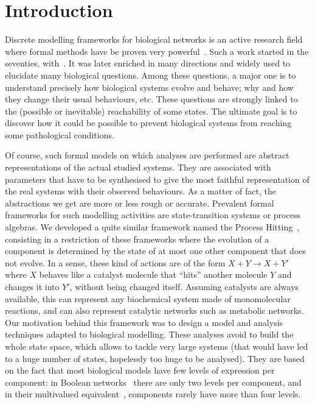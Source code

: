 \section{Introduction}
\label{sec:intro}

Discrete modelling frameworks for biological networks is an active research field where formal
methods have be proven very
powerful~\cite{thomas1990biological,deJong02,snoussi_logical_1993}.
Such a work started in the seventies, with~\cite{kauffman69,Thomas73}.
It was later enriched in many directions and widely used to elucidate many biological questions.
Among these questions, a major one is to understand precisely how biological systems evolve and behave; why and how they change their usual behaviours, etc.
These questions are strongly linked to the (possible or inevitable) reachability of some states.
The ultimate goal is to discover how it could be possible to prevent biological systems from reaching some pathological conditions.

Of course, such formal models on which analyses are performed are abstract representations of the actual studied systems.
They are associated with parameters that have to be synthesised %
to give the most faithful representation of the real systems with their observed behaviours.
As a matter of fact, the abstractions we get are more or less rough or accurate.
Prevalent formal frameworks for such modelling activities are state-transition systems or process algebras. %
We developed a quite similar framework named the Process Hitting~\cite{PMR10-TCSB},
consisting in a restriction of these frameworks where the evolution of a component is determined by the state of at most one other component that does not evolve.
In a sense, these kind of actions are of the form $X + Y \rightarrow X + Y'$ where $X$ behaves like a catalyst molecule that “hits” another molecule $Y$ and changes it into $Y'$, without being changed itself.
Assuming catalysts are always available, this can represent any biochemical system made of monomolecular reactions, and can also represent catalytic networks such as metabolic networks.
Our motivation behind this framework was to design a model and analysis techniques adapted to biological modelling.
These analyses avoid to build the whole state space, which allows to tackle very large systems (that would have led to a huge number of states, hopelessly too huge to be analysed).
They are based on the fact that most biological models have few levels of expression per component:
in Boolean networks~\cite{kauffman69,Thomas73} there are only two levels per component, and in their multivalued equivalent~\cite{deJong02}, components rarely have more than four levels.

